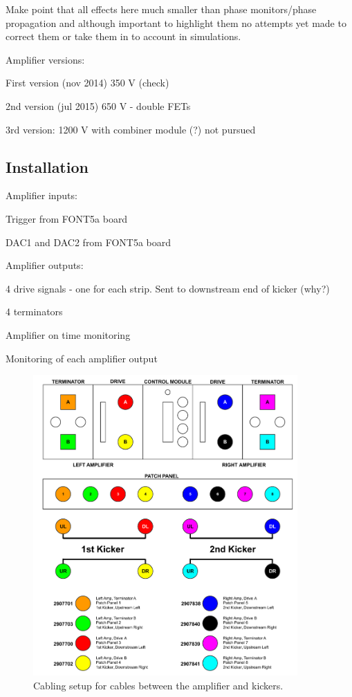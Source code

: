 
Make point that all effects here much smaller than phase monitors/phase propagation and although important to highlight them no attempts yet made to correct them or take them in to account in simulations.

Amplifier versions:

First version (nov 2014) 350 V (check)

2nd version  (jul 2015) 650 V - double FETs

3rd version: 1200 V with combiner module (?) not pursued

\subsection{Installation}
\label{ss:ampInstallation}


Amplifier inputs:

Trigger from FONT5a board

DAC1 and DAC2 from FONT5a board


Amplifier outputs:

4 drive signals - one for each strip. Sent to downstream end of kicker (why?)

4 terminators

Amplifier on time monitoring

Monitoring of each amplifier output

\begin{figure}
  \centering
  \includegraphics[width=0.9\textwidth]{Figures/commissioning/kickerCables}
  \caption{Cabling setup for cables between the amplifier and kickers.}
  \label{f:kickerCables}
\end{figure}



